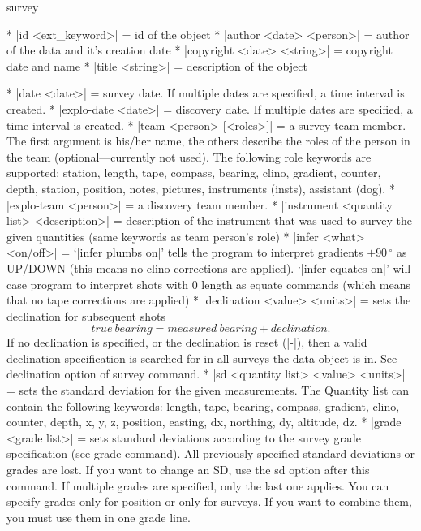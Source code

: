 \context
  survey
\endcontext

\options
  * |id <ext_keyword>| = id of the object
  * |author <date> <person>| = author of the data and it's creation date
  * |copyright <date> <string>| = copyright date and name
  * |title <string>| = description of the object
\endoptions


\comopt
  * |date <date>| = survey date. If multiple dates are specified,
    a time interval is created.
  * |explo-date <date>| = discovery date. If multiple dates are specified,
    a time interval is created.
  * |team <person> [<roles>]| = a survey team member. The first argument
    is his/her name, the others describe the roles of the person in
    the team (optional---currently not used). The following role keywords are
    supported: station, length, tape, compass, bearing, clino,
    gradient, counter, depth, station, position, notes, pictures, 
    instruments (insts), assistant (dog).
  * |explo-team <person>| = a discovery team member. 
  * |instrument <quantity list> <description>| = description
    of the instrument that was used to survey the given quantities (same
    keywords as team person's role)
  * |infer <what> <on/off>| = `|infer plumbs on|' tells the
    program to interpret gradients $\pm90\,^\circ$ 
    as UP/DOWN (this means
    no clino corrections are applied). `|infer equates on|' will case program to
    interpret shots with 0 length as equate commands (which means that no
    tape corrections are applied)
  * |declination <value> <units>| = sets the declination for subsequent
    shots $$true\ bearing = measured\ bearing + declination.$$
    If no declination is specified, or the declination is reset (|-|),
    then a valid declination specification is searched for in all surveys
    the data object is in. See declination option of survey command.
  * |sd <quantity list> <value> <units>| = sets the 
    standard deviation for the given measurements. The Quantity list can 
    contain the following keywords: length, tape, bearing, compass, 
    gradient, clino, counter, depth, x, y, z, position, easting, dx,
    northing, dy, altitude, dz.
  * |grade <grade list>| = sets standard deviations according to the
    survey grade specification (see grade command). All previously
    specified standard deviations or grades are lost. If you want 
    to change an SD, use the sd option after this command. If multiple
    grades are specified, only the last one applies. You can specify
    grades only for position or only for surveys. If you want to
    combine them, you must use them in one grade line.
